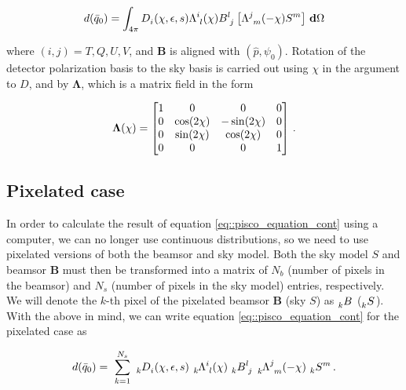 \documentclass[a4paper,11pt]{article}
\begin{document}
\begin{equation}
\begin{aligned}
d(\bar{q}_0) =  \int_{4\pi} \tensor{D}{_{i}}(\chi,\epsilon,s) \tensor{\Lambda}{^{i}_{l}}(\chi)  \tensor{B}{^{l}_{j} } \left[ \tensor{\Lambda}{^{j}_{m}}(-\chi) \tensor{S}{^{m}} \right ] \, \mathbf{d} \Omega 
\end{aligned}
\label{eq::pisco_equation_cont}
\end{equation}

\noindent
where $(i,j) = T,Q,U,V$, and $\mathbf{B}$ is aligned with $(\hat{p},\psi_0)$. Rotation of the detector polarization basis to the sky basis is carried out using $\chi$ in the argument to $D$, and by $\mathbf{\Lambda}$, which is a matrix field in the form

\begin{equation}
\begin{aligned}
\mathbf{\Lambda}(\chi) =
\begin{bmatrix}
1  & 0 & 0 & 0\\
0  & \cos(2\chi) & -\sin(2\chi) & 0\\
0  &\sin(2\chi) & \cos(2\chi) & 0\\
0  & 0 & 0 & 1
\end{bmatrix}  \, \rm{.}
\end{aligned}
\label{eq::lambda_operator}
\end{equation}

\subsection{Pixelated case}
\label{sec::pixel_conv}

In order to calculate the result of equation \ref{eq::pisco_equation_cont} using a computer, we can no longer use continuous distributions, so we need to use pixelated versions of both the beamsor and sky model. Both the sky model $S$ and beamsor $\mathbf{B}$ must then be transformed into a matrix of $N_b$ (number of pixels in the beamsor) and $N_s$ (number of pixels in the sky model) entries, respectively. We will denote the $k$-th pixel of the pixelated beamsor $\mathbf{B}$ (sky $S$) as $\tensor[_k]{B}{}$ ($\tensor[_k]{S}{}$). With the above in mind, we can write equation \ref{eq::pisco_equation_cont} for the pixelated case as

\begin{equation}
\begin{aligned}
d(\bar{q}_0) = \
\sum_{k=1}^{N_s} \
\tensor[_k]{D}{_{i}}(\chi,\epsilon,s) \
\tensor[_k]{\Lambda}{^{i}_{l}}(\chi) \
\tensor[_k]{B}{^l_j} \
\tensor[_k]{\Lambda}{^{j}_{m}}(-\chi) \
\tensor[_k]{S}{^m}  \, \rm{.}
\end{aligned}
\label{eq::discrete_beam_conv_tensor}
\end{equation}
\end{document}
